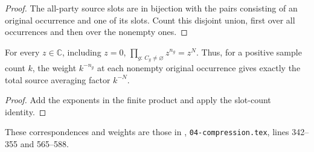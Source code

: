 \begin{proof}\leanok
    The all-party source slots are in bijection with the pairs consisting
    of an original occurrence and one of its slots. Count this disjoint
    union, first over all occurrences and then over the nonempty ones.
\end{proof}

\begin{theorem}
    \label{thm:peps_source_averaging_product}
    \leanok
    For every $z\in\mathbb C$, including $z=0$,
    $\prod_{g:\,C_g\ne\varnothing}z^{n_g}=z^N$.
    Thus, for a positive sample count $k$, the weight $k^{-n_g}$ at each nonempty original occurrence
    gives exactly the total source averaging factor $k^{-N}$.
\end{theorem}

\begin{proof}\leanok
    Add the exponents in the finite product and apply the slot-count identity.
\end{proof}

These correspondences and weights are those in
\cite[proof of Theorem~5.2]{OpenAI2026PolynomialPEPS},
\texttt{04-compression.tex}, lines 342--355 and 565--588.
